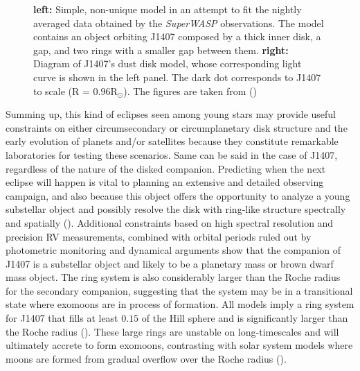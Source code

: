 \begin{figure}[!ht]
\centering
\caption{\scriptsize{ \textbf{left:} Simple, non-unique model in an attempt to fit the nightly averaged data obtained by the \textit{SuperWASP} observations. The model contains an object orbiting J1407 composed by a thick inner disk, a gap, and two rings with a smaller gap between them. \textbf{right:} Diagram of J1407's dust disk model, whose corresponding light curve is shown in the left panel. The dark dot corresponds to J1407 to scale (R = $0.96$R$_\odot$). The figures are taken from (\citeyear{2012AJ....143...72M})}}
\label{fig:Mamajek_J1407}
\end{figure}

Summing up, this kind of eclipses seen among young stars may provide useful constraints on either circumsecondary or circumplanetary disk structure and the early evolution of planets and/or satellites because they constitute remarkable laboratories for testing these scenarios. Same can be said in the case of J1407, regardless of the nature of the disked companion. Predicting when the next eclipse will happen is vital to planning an extensive and detailed observing campaign, and also because this object offers the opportunity to analyze a young substellar object and possibly resolve the disk with ring-like structure spectrally and spatially  (\citeyear{2015MNRAS.446..411K}). Additional constraints based on high spectral resolution and precision RV measurements, combined with orbital periods ruled out by photometric monitoring and dynamical arguments show that the companion of J1407 is a substellar object and likely to be a planetary mass or brown dwarf mass object. The ring system is also considerably larger than the Roche radius for the secondary companion, suggesting that the system may be in a transitional state where exomoons are in process of formation. All models imply a ring system for J1407 that fills at least $0.15$ of the Hill sphere and is significantly larger than the Roche radius  (\citeyear{2015MNRAS.446..411K}). These large rings are unstable on long-timescales and will ultimately accrete to form exomoons, contrasting with solar system models where moons are formed from gradual overflow over the Roche radius  (\citeyear{2012Sci...338.1196C}).   